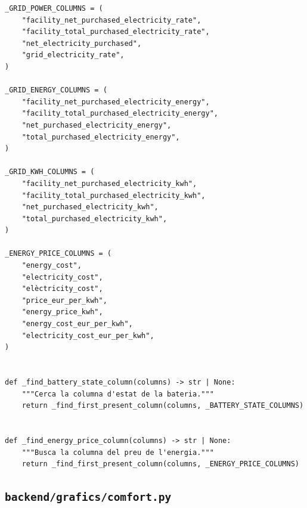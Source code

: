 \documentclass[10pt,a4paper]{article}
\begin{document}
\begin{lstlisting}[style=studioPython,caption={backend/grafics/column\_utils.py},label={lst:backend-grafics-column-utils-py}]
_GRID_POWER_COLUMNS = (
    "facility_net_purchased_electricity_rate",
    "facility_total_purchased_electricity_rate",
    "net_electricity_purchased",
    "grid_electricity_rate",
)

_GRID_ENERGY_COLUMNS = (
    "facility_net_purchased_electricity_energy",
    "facility_total_purchased_electricity_energy",
    "net_purchased_electricity_energy",
    "total_purchased_electricity_energy",
)

_GRID_KWH_COLUMNS = (
    "facility_net_purchased_electricity_kwh",
    "facility_total_purchased_electricity_kwh",
    "net_purchased_electricity_kwh",
    "total_purchased_electricity_kwh",
)

_ENERGY_PRICE_COLUMNS = (
    "energy_cost",
    "electricity_cost",
    "elèctricity_cost",
    "price_eur_per_kwh",
    "energy_price_kwh",
    "energy_cost_eur_per_kwh",
    "electricity_cost_eur_per_kwh",
)


def _find_battery_state_column(columns) -> str | None:
    """Cerca la columna d'estat de la bateria."""
    return _find_first_present_column(columns, _BATTERY_STATE_COLUMNS)


def _find_energy_price_column(columns) -> str | None:
    """Busca la columna del preu de l'energia."""
    return _find_first_present_column(columns, _ENERGY_PRICE_COLUMNS)
\end{lstlisting}


\subsection{\texorpdfstring{\texttt{backend/grafics/comfort.py}}{backend/grafics/comfort.py}}
\end{document}

